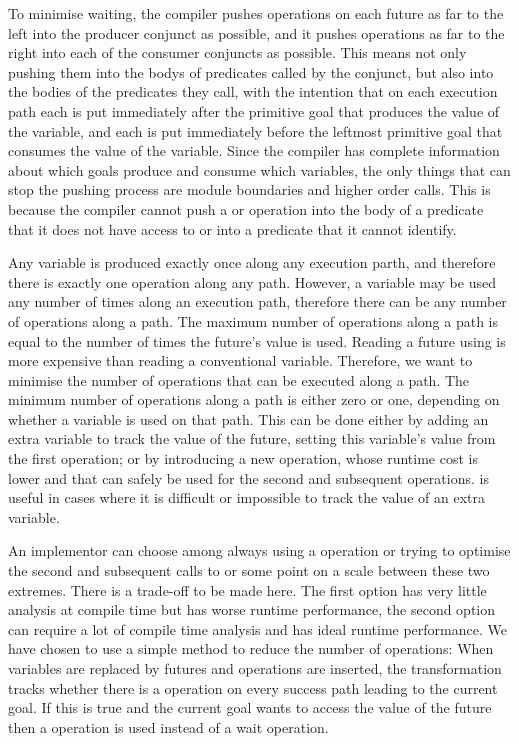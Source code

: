 To minimise waiting,
the compiler pushes \signal operations on each future
as far to the left into the producer conjunct as possible,
and it pushes \wait operations
as far to the right into each of the consumer conjuncts as possible.
This means not only pushing them
into the bodys of predicates called by the conjunct,
but also into the bodies of the predicates they call,
with the intention that on each execution path
each \signal is put immediately after
the primitive goal that produces the value of the variable,
and each \wait is put immediately before
the leftmost primitive goal that consumes the value of the variable.
Since the compiler has complete information
about which goals produce and consume which variables,
the only things that can stop the pushing process
are module boundaries and  higher order calls.
This is because
the compiler cannot push a \wait or \signal operation
into the body of a predicate that it does not have access to
or into a predicate that it cannot identify.

Any variable is produced exactly once along any execution parth,
and therefore there is exactly one \signal operation along any path.
However, a variable may be used any number of times along an execution path,
therefore there can be any number of \wait operations along a path.
The maximum number of \wait operations along a path is equal to the number
of times the future's value is used.
Reading a future using \wait is more expensive than reading a conventional
variable.
Therefore, we want to minimise the number of \wait operations that can be
executed along a path.
The minimum number of \wait operations along a path is either zero or one,
depending on whether a variable is used on that path.
This can be done either by adding an extra variable to track the value of
the future, setting this variable's value from the first \wait operation;
or by introducing a new operation, \get whose runtime cost is lower
and that can safely be used for the second and subsequent \wait operations.
\get is useful in cases where it is difficult or impossible to track the
value of an extra variable.

An implementor can choose among always using a \wait operation or
trying to optimise the second and subsequent calls to \wait or
some point on a scale between these two extremes.
There is a trade-off to be made here.
The first option has very little analysis at compile time but has worse
runtime performance,
the second option can require a lot of compile time analysis and has ideal
runtime performance.
We have chosen to use a simple method to reduce the number of \wait
operations:
When variables are replaced by futures and \wait operations are inserted,
the transformation tracks whether there is a \wait operation on every success
path leading to the current goal.
If this is true and the current goal wants to access the value of the future
then a \get operation is used instead of a wait operation.

